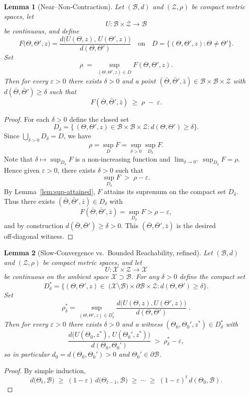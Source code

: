 \documentclass[12pt]{article}
\theoremstyle{definition}
\theoremstyle{plain}
\newtheorem{lemma}{Lemma}[section]
\begin{document}
\begin{lemma}[Near–Non‑Contraction]\label{lem:near-non-contract}
Let \((\mathcal B,d)\) and \((\mathcal Z,\rho)\) be compact metric spaces, let
\[
U:\mathcal B\times\mathcal Z\to\mathcal B
\]
be continuous, and define
\[
F\bigl(\Theta,\Theta',z\bigr)
=\frac{d\bigl(U(\Theta,z),\,U(\Theta',z)\bigr)}{d(\Theta,\Theta')}
\quad\text{on}\quad
D=\{(\Theta,\Theta',z):\Theta\neq\Theta'\}.
\]
Set
\[
\rho \;=\;\sup_{(\Theta,\Theta',z)\in D}F(\Theta,\Theta',z).
\]
Then for every \(\varepsilon>0\) there exists \(\delta>0\) and a point
\((\bar\Theta,\bar\Theta',\bar z)\in\mathcal B\times\mathcal B\times\mathcal Z\)
with \(d(\bar\Theta,\bar\Theta')\ge\delta\) such that
\[
F(\bar\Theta,\bar\Theta',\bar z)
\;\ge\;\rho \;-\;\varepsilon.
\]
\end{lemma}

\begin{proof}
For each \(\delta>0\) define the closed set
\[
D_\delta
=\{\,(\Theta,\Theta',z)\in\mathcal B\times\mathcal B\times\mathcal Z:
   d(\Theta,\Theta')\ge\delta\}.
\]
Since \(\bigcup_{\delta>0}D_\delta=D\), we have
\[
\rho
=\sup_{D}F
=\sup_{\delta>0}\sup_{D_\delta}F.
\]
Note that \(\delta\mapsto\sup_{D_\delta}F\) is a non‑increasing function and
\(\lim_{\delta\to0^+}\sup_{D_\delta}F=\rho\).  Hence given
\(\varepsilon>0\), there exists \(\delta>0\) such that
\[
\sup_{D_\delta}F \;>\;\rho-\varepsilon.
\]
By Lemma~\ref{lem:sup-attained}, \(F\) attains its supremum on the compact
set \(D_\delta\).  Thus there exists
\((\bar\Theta,\bar\Theta',\bar z)\in D_\delta\) with
\[
F(\bar\Theta,\bar\Theta',\bar z)
=\sup_{D_\delta}F
>\rho-\varepsilon,
\]
and by construction \(d(\bar\Theta,\bar\Theta')\ge\delta>0\).  This
\((\bar\Theta,\bar\Theta',\bar z)\) is the desired off‑diagonal witness.
\end{proof}


\begin{lemma}[Slow‑Convergence vs.\ Bounded Reachability, refined]
Let \((\mathcal B,d)\) and \((\mathcal Z,\rho)\) be compact metric spaces, and let 
\[
U:\mathcal X\times\mathcal Z\to\mathcal X
\]
be continuous on the ambient space \(\mathcal X\supset\mathcal B\).  For any \(\delta>0\) define the compact set
\[
D^*_\delta
=\bigl\{
 (\Theta,\Theta',z)\in\;\bigl(\mathcal X\setminus\mathcal B\bigr)\times\partial\mathcal B\times\mathcal Z:
 d(\Theta,\Theta')\ge\delta
\bigr\}.
\]
Set
\[
\rho^*_\delta
=\sup_{(\Theta,\Theta',z)\in D^*_\delta}
\frac{d\!\bigl(U(\Theta,z),U(\Theta',z)\bigr)}
     {d(\Theta,\Theta')}
\;.
\]
Then for every \(\varepsilon>0\) there exists \(\delta>0\) and a witness
\((\Theta_0,\Theta_0',z^*)\in D^*_\delta\) with
\[
\frac{d\bigl(U(\Theta_0,z^*),\,U(\Theta_0',z^*)\bigr)}
     {d(\Theta_0,\Theta_0')}
\;>\;\rho^*_\delta-\varepsilon,
\]
so in particular \(d_0=d(\Theta_0,\Theta_0')>0\) and \(\Theta_0'\in\partial\mathcal B\).
\end{lemma}
\begin{proof}
By simple induction,
\[
  d\bigl(\Theta_t,\mathcal B\bigr)
  \;\ge\;(1-\varepsilon)\,d\bigl(\Theta_{t-1},\mathcal B\bigr)
  \;\ge\;\cdots\;\ge\;(1-\varepsilon)^t\,d(\Theta_0,\mathcal B).
\]
\end{proof}
\end{document}
